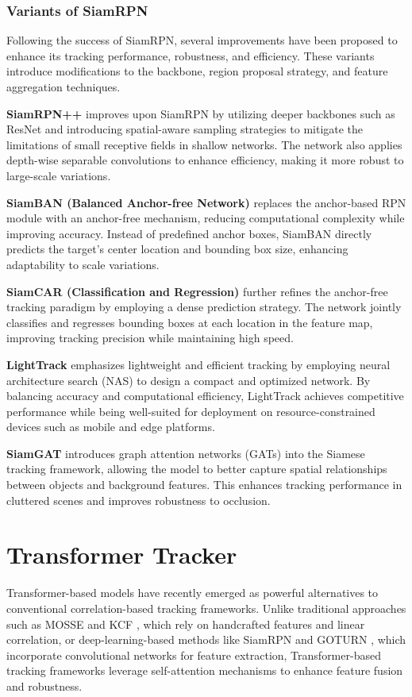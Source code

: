 \subsubsection{Variants of SiamRPN}

Following the success of SiamRPN, several improvements have been proposed to enhance its tracking performance, robustness, and efficiency. These variants introduce modifications to the backbone, region proposal strategy, and feature aggregation techniques.

\textbf{SiamRPN++} \cite{li2019siamrpn++} improves upon SiamRPN by utilizing deeper backbones such as ResNet and introducing spatial-aware sampling strategies to mitigate the limitations of small receptive fields in shallow networks. The network also applies depth-wise separable convolutions to enhance efficiency, making it more robust to large-scale variations.

\textbf{SiamBAN (Balanced Anchor-free Network)} \cite{chen2022siamban} replaces the anchor-based RPN module with an anchor-free mechanism, reducing computational complexity while improving accuracy. Instead of predefined anchor boxes, SiamBAN directly predicts the target’s center location and bounding box size, enhancing adaptability to scale variations.

\textbf{SiamCAR (Classification and Regression)} \cite{guo2020siamcar} further refines the anchor-free tracking paradigm by employing a dense prediction strategy. The network jointly classifies and regresses bounding boxes at each location in the feature map, improving tracking precision while maintaining high speed.

\textbf{LightTrack} \cite{yan2021lighttrack} emphasizes lightweight and efficient tracking by employing neural architecture search (NAS) to design a compact and optimized network. By balancing accuracy and computational efficiency, LightTrack achieves competitive performance while being well-suited for deployment on resource-constrained devices such as mobile and edge platforms.

\textbf{SiamGAT} \cite{lu2023siamese} introduces graph attention networks (GATs) into the Siamese tracking framework, allowing the model to better capture spatial relationships between objects and background features. This enhances tracking performance in cluttered scenes and improves robustness to occlusion.

\section{Transformer Tracker}
Transformer-based models have recently emerged as powerful alternatives to conventional correlation-based tracking frameworks. Unlike traditional approaches such as MOSSE \cite{bolme2010visual} and KCF \cite{henriques2014high}, which rely on handcrafted features and linear correlation, or deep-learning-based methods like SiamRPN \cite{li2018high} and GOTURN \cite{held2016learning}, which incorporate convolutional networks for feature extraction, Transformer-based tracking frameworks leverage self-attention mechanisms to enhance feature fusion and robustness.


